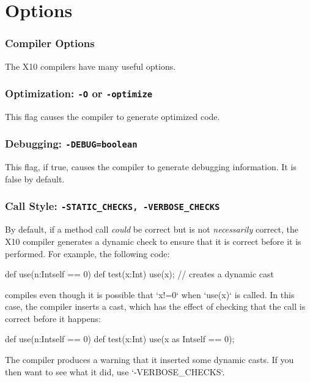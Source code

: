 \chapter{Options}

\subsection{Compiler Options}

The X10 compilers have many useful options. 


\subsection{Optimization: {\tt -O} or {\tt -optimize}}

This flag causes the compiler to generate optimized code.


\subsection{Debugging: {\tt -DEBUG=boolean}}

This flag, if true, causes the compiler to generate debugging information.  It
is false by default.

\subsection{Call Style: {\tt -STATIC\_CHECKS, -VERBOSE\_CHECKS}}
\label{sect:Callstyle}

By default, if a method call {\em could} be correct but is not {\em
necessarily} correct, the X10 compiler generates a dynamic check to ensure
that it is correct before it is performed.  For example, the following code: 
\begin{xten}
def use(n:Int{self == 0}) {}
def test(x:Int) { 
   use(x); // creates a dynamic cast
}
\end{xten}
compiles even though it is possible that 
\xcd`x!=0` when \xcd`use(x)` is called.  In this case, the compiler inserts a
cast, which has the effect of checking that the call is correct before it
happens: 
\begin{xten}
def use(n:Int{self == 0}) {}
def test(x:Int) { 
   use(x as Int{self == 0}); 
}
\end{xten}
The compiler produces a warning that it inserted some dynamic casts.
If you then want to see what it did, use \xcd`-VERBOSE_CHECKS`.

